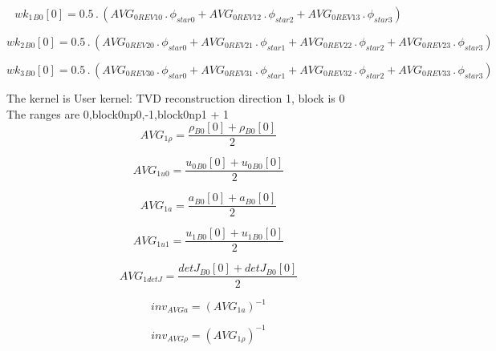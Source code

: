 \documentclass{article}
\begin{document}
\begin{dmath}{wk_{1}{_{B0}}}[{0}] = 0.5 \,.\, \left(AVG_{0 REV 10} \,.\, \phi_{star 0} + AVG_{0 REV 12} \,.\, \phi_{star 2} + AVG_{0 REV 13} \,.\, \phi_{star 3}\right)\end{dmath}

\begin{dmath}{wk_{2}{_{B0}}}[{0}] = 0.5 \,.\, \left(AVG_{0 REV 20} \,.\, \phi_{star 0} + AVG_{0 REV 21} \,.\, \phi_{star 1} + AVG_{0 REV 22} \,.\, \phi_{star 2} + AVG_{0 REV 23} \,.\, \phi_{star 3}\right)\end{dmath}

\begin{dmath}{wk_{3}{_{B0}}}[{0}] = 0.5 \,.\, \left(AVG_{0 REV 30} \,.\, \phi_{star 0} + AVG_{0 REV 31} \,.\, \phi_{star 1} + AVG_{0 REV 32} \,.\, \phi_{star 2} + AVG_{0 REV 33} \,.\, \phi_{star 3}\right)\end{dmath}

\noindent The kernel is User kernel: TVD reconstruction direction 1, block is 0\\\noindent The ranges are 0,block0np0,-1,block0np1 + 1\\\begin{dmath}AVG_{1 \rho} = \frac{{\rho{_{B0}}}[{0}] + {\rho{_{B0}}}[{0}]}{2}\end{dmath}

\begin{dmath}AVG_{1 u0} = \frac{{u_{0}{_{B0}}}[{0}] + {u_{0}{_{B0}}}[{0}]}{2}\end{dmath}

\begin{dmath}AVG_{1 a} = \frac{{a{_{B0}}}[{0}] + {a{_{B0}}}[{0}]}{2}\end{dmath}

\begin{dmath}AVG_{1 u1} = \frac{{u_{1}{_{B0}}}[{0}] + {u_{1}{_{B0}}}[{0}]}{2}\end{dmath}

\begin{dmath}AVG_{1 detJ} = \frac{{detJ{_{B0}}}[{0}] + {detJ{_{B0}}}[{0}]}{2}\end{dmath}

\begin{dmath}inv_{AVG a} = \left(AVG_{1 a} \right)^{-1}\end{dmath}

\begin{dmath}inv_{AVG \rho} = \left(AVG_{1 \rho} \right)^{-1}\end{dmath}
\end{document}
